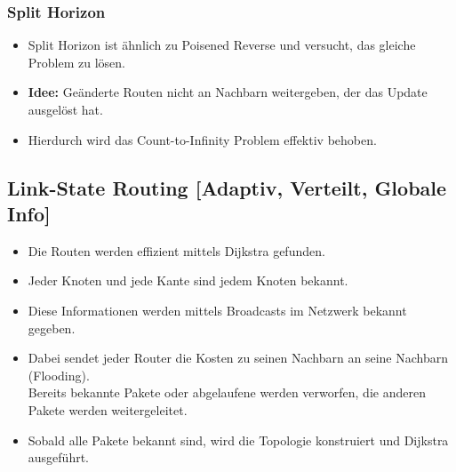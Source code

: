 			\subsubsection{Split Horizon}
				\begin{itemize}
					\item Split Horizon ist ähnlich zu Poisened Reverse und versucht, das gleiche Problem zu lösen.
					\item \textbf{Idee:} Geänderte Routen nicht an Nachbarn weitergeben, der das Update ausgelöst hat.
					\item Hierdurch wird das Count-to-Infinity Problem effektiv behoben.
				\end{itemize}

		\subsection{Link-State Routing [Adaptiv, Verteilt, Globale Info]}
			\begin{itemize}
				\item Die Routen werden effizient mittels Dijkstra gefunden.
				\item Jeder Knoten und jede Kante sind jedem Knoten bekannt.
				\item Diese Informationen werden mittels Broadcasts im Netzwerk bekannt gegeben.
				\item Dabei sendet jeder Router die Kosten zu seinen Nachbarn an seine Nachbarn (Flooding). \\ Bereits bekannte Pakete oder abgelaufene werden verworfen, die anderen Pakete werden weitergeleitet.
				\item Sobald alle Pakete bekannt sind, wird die Topologie konstruiert und Dijkstra ausgeführt.
			\end{itemize}

